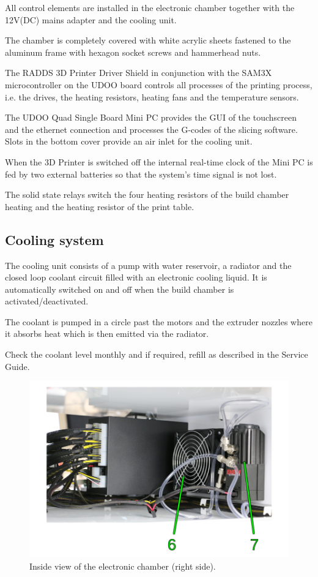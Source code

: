 All control elements are installed in the electronic chamber together with the 12V(DC) mains adapter and the cooling unit.

The chamber is completely covered with white acrylic sheets fastened to the aluminum frame with hexagon socket screws and hammerhead nuts.

The RADDS 3D Printer Driver Shield in conjunction with the SAM3X microcontroller on the UDOO board controls all processes of the printing process, i.e. the drives, the heating resistors, heating fans and the temperature sensors.

The UDOO Quad Single Board Mini PC provides the GUI of the touchscreen and the ethernet connection and processes the G-codes of the slicing software.
Slots in the bottom cover provide an air inlet for the cooling unit.

When the 3D Printer is switched off the internal real-time clock of the Mini PC is fed by two external batteries so that the system's time signal is not lost.

The solid state relays switch the four heating resistors of the build chamber heating and the heating resistor of the print table.

\subsection{Cooling system}

The cooling unit consists of a pump with water reservoir, a radiator and the closed loop coolant circuit filled with an electronic cooling liquid. It is automatically switched on and off when the build chamber is activated/deactivated.

The coolant is pumped in a circle past the motors and the extruder nozzles where it absorbs heat which is then emitted via the radiator.

Check the coolant level monthly and if required, refill as described in the Service Guide. 

\begin{figure}[H]
  \centering
  \includegraphics[width=.7\linewidth]{./img/desc_ht500_overviewelectronicchamberright.png}
  \caption{Inside view of the electronic chamber (right side).}
\end{figure}

